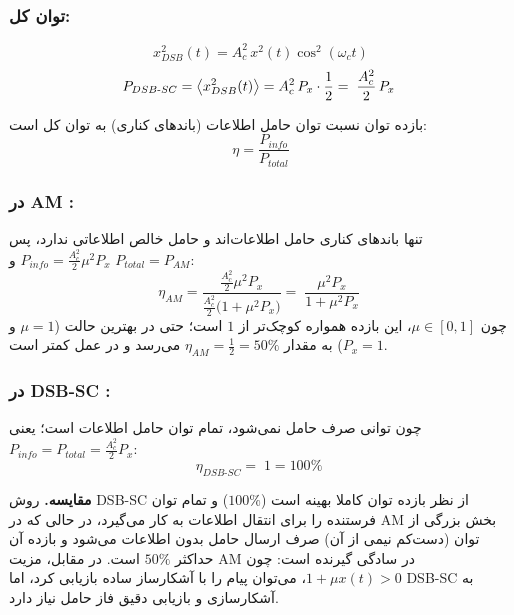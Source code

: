 \subsubsection*{توان کل:}
\[
x_{DSB}^2(t) = A_c^2\, x^2(t)\cos^2(\omega_c t)
\]
\[
P_{DSB\text{-}SC} = \left< x_{DSB}^2(t) \right>
                 = A_c^2\, P_x \cdot \frac{1}{2}
                 = {\;\frac{A_c^2}{2}\,P_x\;}
\]


بازده توان نسبت توان حامل اطلاعات (باندهای کناری) به توان کل است:
\[
\eta = \frac{P_{info}}{P_{total}}
\]

\subsubsection*{در AM :}
 تنها باندهای کناری حامل اطلاعات‌اند و حامل خالص اطلاعاتی ندارد، پس
$P_{info} = \frac{A_c^2}{2}\mu^2 P_x$ و $P_{total} = P_{AM}$:
\[
\eta_{AM} = \frac{\frac{A_c^2}{2}\mu^2 P_x}{\frac{A_c^2}{2}\big(1+\mu^2 P_x\big)}
          = {\;\frac{\mu^2 P_x}{1 + \mu^2 P_x}\;}
\]
چون $\mu \in [0,1]$، این بازده همواره کوچک‌تر از $1$ است؛ حتی در بهترین حالت ($\mu=1$ و $P_x=1$) به مقدار $\eta_{AM} = \tfrac{1}{2} = 50\%$ می‌رسد و در عمل کمتر است.

\subsubsection*{در DSB-SC :}
 چون توانی صرف حامل نمی‌شود، تمام توان حامل اطلاعات است؛ یعنی
$P_{info} = P_{total} = \frac{A_c^2}{2}P_x$:
\[
\eta_{DSB\text{-}SC} = {\;1 = 100\%\;}
\]

\textbf{مقایسه.} روش DSB-SC از نظر بازده توان کاملا بهینه است ($100\%$) و تمام توان فرستنده را برای انتقال اطلاعات به کار می‌گیرد، در حالی که در AM بخش بزرگی از توان (دست‌کم نیمی از آن) صرف ارسال حامل بدون اطلاعات می‌شود و بازده آن حداکثر $50\%$ است. در مقابل، مزیت AM در سادگی گیرنده است: چون $1+\mu x(t) > 0$، می‌توان پیام را با آشکارساز  ساده بازیابی کرد، اما DSB-SC به آشکارسازی  و بازیابی دقیق فاز حامل نیاز دارد.
